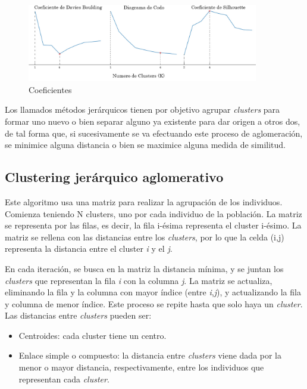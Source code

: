 	\begin{figure}[!h]
		\centering
		\includegraphics[width=0.90\textwidth]{images/chapter_2/ap_nosup_diagramas}
		\caption{Coeficientes}
		\label{fig:coeficientes}
	\end{figure}
	
	\newpage


	Los llamados métodos jerárquicos \cite{ackermann2014analysis} tienen por objetivo agrupar \textit{clusters} para formar uno nuevo o bien separar alguno ya existente para dar origen a otros dos, de tal forma que, si sucesivamente se va efectuando este proceso de aglomeración, se minimice alguna distancia o bien se maximice alguna medida de similitud.

	\subsection{Clustering jerárquico aglomerativo}

		Este algoritmo usa una matriz para realizar la agrupación de los individuos. Comienza teniendo N clusters, uno por cada individuo de la población. La matriz se representa por las filas, es decir, la fila i-ésima representa el cluster i-ésimo. La matriz se rellena con las distancias entre los \textit{clusters}, por lo que la celda (i,j) representa la distancia entre el cluster \textit{i} y el \textit{j}.  
		
		En cada iteración, se busca en la matriz la distancia mínima, y se juntan los \textit{clusters} que representan la fila \textit{i} con la columna \textit{j}. La matriz se actualiza, eliminando la fila y la columna con mayor índice (entre \textit{i},\textit{j}), y actualizando la fila y columna de menor índice. Este proceso se repite hasta que solo haya un \textit{cluster}. Las distancias entre \textit{clusters} pueden ser:
		\begin{itemize}
		\vspace{-0.25cm}
		\item Centroides: cada cluster tiene un centro.
		\vspace{-0.25cm}
		\item Enlace simple o compuesto: la distancia entre \textit{clusters} viene dada por la menor o mayor distancia, respectivamente, entre los individuos que representan cada \textit{cluster}.
		\vspace{-0.30cm}
		\end{itemize}



